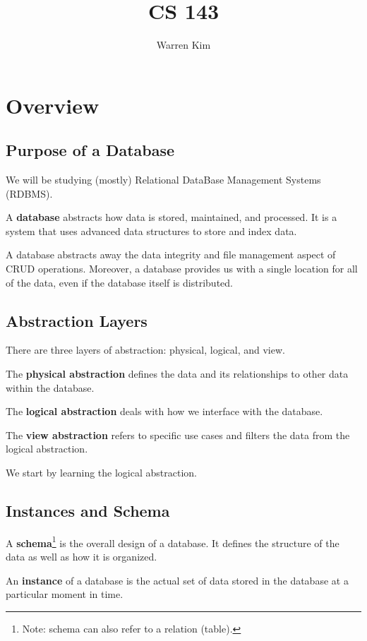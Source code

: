 \documentclass{report}
\title{CS 143}
\author{Warren Kim}
\date{}
\newenvironment{definition}[1]{\begin{tcolorbox}[title={Definition: #1}]}{\end{tcolorbox}}
\renewcommand{\bf}[1]{\textbf{{#1}}}
\begin{document}
\maketitle

\tableofcontents
\newpage

\chapter{Overview}
\section{Purpose of a Database}
We will be studying (mostly) Relational DataBase Management Systems (RDBMS).
\begin{definition}{Database}
    A \bf{database} abstracts how data is stored, maintained, and processed. It is a system that uses
    advanced data structures to store and index data.
\end{definition}
A database abstracts away the data integrity and file management aspect of CRUD operations. Moreover,
a database provides us with a single location for all of the data, even if the database itself is
distributed.


\section{Abstraction Layers}
There are three layers of abstraction: physical, logical, and view. 
\begin{definition}{Physical Abstraction}
    The \bf{physical abstraction} defines the data and its relationships to other data within the 
    database.
\end{definition}
\begin{definition}{Logical Abstraction}
    The \bf{logical abstraction} deals with how we interface with the database.
\end{definition}
\begin{definition}{View Abstraction}
    The \bf{view abstraction} refers to specific use cases and filters the data from the logical
    abstraction.
\end{definition}
We start by learning the logical abstraction.


\section{Instances and Schema}
\begin{definition}{Schema and Instance}
    A \bf{schema}\footnote{Note: schema can also refer to a relation (table).} is the overall design 
    of a database. It defines the structure of the data as well as how it is organized. \vspace{10pt}

    An \bf{instance} of a database is the actual set of data stored in the database at a particular 
    moment in time. 
\end{definition}
\end{document}
